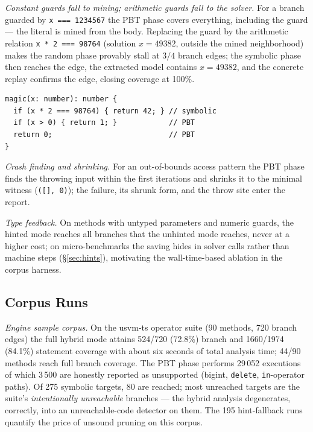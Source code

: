 \documentclass[sigconf,nonacm,screen]{acmart}
\begin{document}
\emph{Constant guards fall to mining; arithmetic guards fall to the
solver.} For a branch guarded by \lstinline|x === 1234567| the PBT phase
covers everything, including the guard --- the literal is mined from the
body. Replacing the guard by the arithmetic relation
\lstinline|x * 2 === 98764| (solution $x = 49382$, outside the mined
neighborhood) makes the random phase provably stall at $3/4$ branch edges;
the symbolic phase then reaches the edge, the extracted model contains
$x = 49382$, and the concrete replay confirms the edge, closing coverage at
100\%.

\begin{lstlisting}[caption={The hybrid split on a micro-benchmark: PBT
covers all edges except the arithmetic guard; the symbolic phase synthesizes
$x=49382$ and the replay confirms it.},label={lst:magic}]
magic(x: number): number {
  if (x * 2 === 98764) { return 42; } // symbolic
  if (x > 0) { return 1; }            // PBT
  return 0;                           // PBT
}
\end{lstlisting}

\emph{Crash finding and shrinking.} For an out-of-bounds access pattern the
PBT phase finds the throwing input within the first iterations and shrinks
it to the minimal witness (\lstinline|([], 0)|); the failure, its shrunk
form, and the throw site enter the report.

\emph{Type feedback.} On methods with untyped parameters and numeric
guards, the hinted mode reaches all branches that the unhinted mode
reaches, never at a higher cost; on micro-benchmarks the saving hides in
solver calls rather than machine steps (\S\ref{sec:hints}), motivating the
wall-time-based ablation in the corpus harness.

\subsection{Corpus Runs}
\label{sec:corpus}

\emph{Engine sample corpus.} On the usvm-ts operator suite (90 methods,
720 branch edges) the full hybrid mode attains 524/720 (72.8\%) branch and
1660/1974 (84.1\%) statement coverage with about six seconds of total
analysis time; 44/90 methods reach full branch coverage. The PBT phase
performs 29\,052 executions of which 3\,500 are honestly reported as
unsupported (bigint, \lstinline|delete|, \lstinline|in|-operator paths).
Of 275 symbolic targets, 80 are reached; most unreached targets are the
suite's \emph{intentionally unreachable} branches --- the hybrid analysis
degenerates, correctly, into an unreachable-code detector on them. The
195 hint-fallback runs quantify the price of unsound pruning on this
corpus.
\end{document}
